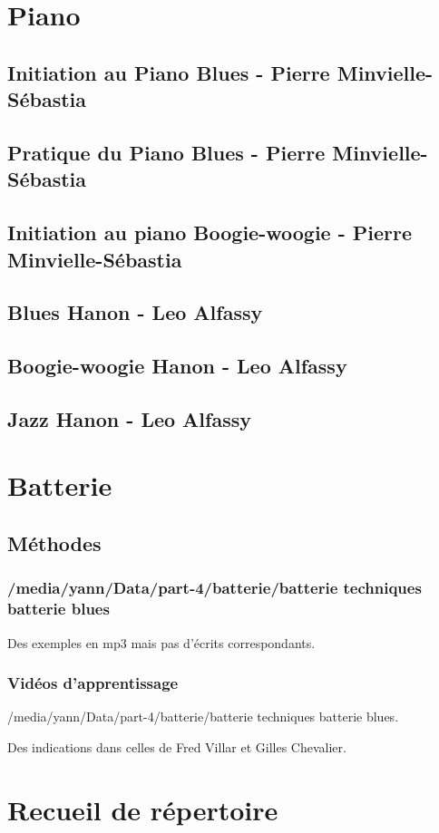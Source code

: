 \documentclass[a4paper]{book}
\begin{document}
\clearpage\chapter[Piano]{Piano}
\section{Initiation au Piano Blues - Pierre Minvielle-S\'ebastia}
\section{Pratique du Piano Blues - Pierre Minvielle-S\'ebastia}
\section{Initiation au piano Boogie-woogie - Pierre Minvielle-S\'ebastia}
\section{Blues Hanon - Leo Alfassy}
\section{Boogie-woogie Hanon - Leo Alfassy}
\section{Jazz Hanon - Leo Alfassy}

\clearpage\chapter{Batterie}
\clearpage\section{Méthodes}
\subsection{/media/yann/Data/part-4/batterie/batterie techniques batterie blues}
Des exemples en mp3 mais pas d'écrits correspondants.
\subsection{Vidéos d'apprentissage}
/media/yann/Data/part-4/batterie/batterie techniques batterie blues.

Des indications dans celles de Fred Villar et Gilles Chevalier.

\clearpage\chapter[Recueil de r\'epertoire]{Recueil de r\'epertoire}
\end{document}
